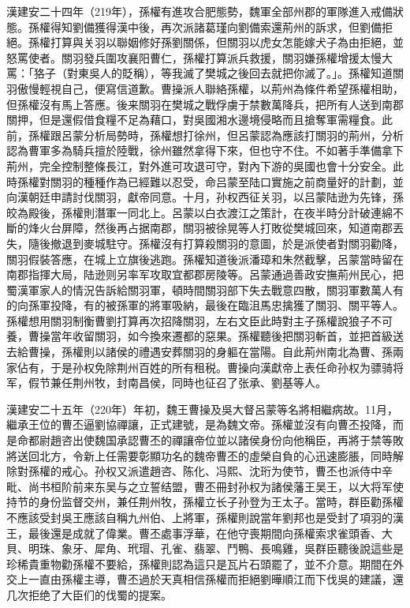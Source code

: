 漢建安二十四年（219年），孫權有進攻合肥態勢，魏軍全部州郡的軍隊進入戒備狀態。孫權得知劉備獲得漢中後，再次派諸葛瑾向劉備索還荊州的訴求，但劉備拒絕。孫權打算與关羽以聯姻修好孫劉關係，但關羽以虎女怎能嫁犬子為由拒絕，並怒罵使者。關羽發兵圍攻襄阳曹仁，孫權打算派兵救援，關羽嫌孫權增援太慢大罵：「狢子（對東吳人的貶稱），等我滅了樊城之後回去就把你滅了。」。孫權知道關羽傲慢輕視自己，便寫信道歉。曹操派人聯絡孫權，以荊州為條件希望孫權相助，但孫權沒有馬上答應。後来關羽在樊城之戰俘虜于禁數萬降兵，把所有人送到南郡關押，但是還假借食糧不足為藉口，對吳國湘水邊境侵略而且搶奪軍需糧食。此前，孫權跟呂蒙分析局勢時，孫權想打徐州，但呂蒙認為應該打關羽的荊州，分析認為曹軍多為騎兵擅於陸戰，徐州雖然拿得下來，但也守不住。不如著手準備拿下荊州，完全控制整條長江，對外進可攻退可守，對內下游的吳國也會十分安全。此時孫權對關羽的種種作為已經難以忍受，命吕蒙至陆口實施之前商量好的計劃，並向漢朝廷申請討伐關羽，獻帝同意。十月，孙权西征关羽，以吕蒙陆逊为先锋，孫皎為殿後，孫權則潛軍一同北上。呂蒙以白衣渡江之策計，在夜半時分計破連綿不斷的烽火台屏障，然後再占据南郡，關羽被徐晃等人打敗從樊城回來，知道南郡丟失，隨後撤退到麥城駐守。孫權沒有打算殺關羽的意圖，於是派使者對關羽勸降，關羽假裝答應，在城上立旗後逃跑。孫權知道後派潘璋和朱然截擊，呂蒙當時留在南郡指揮大局，陆逊则另率军攻取宜都郡房陵等。呂蒙通過善政安撫荊州民心，把蜀漢軍家人的情況告訴給關羽軍，頓時間關羽部下失去戰意四散，關羽軍數萬人有的向孫軍投降，有的被孫軍的將軍吸納，最後在臨沮馬忠擒獲了關羽、關平等人。孫權想用關羽制衡曹劉打算再次招降關羽，左右文臣此時對主子孫權說狼子不可養，曹操當年收留關羽，如今換來遷都的惡果。孫權聽後把關羽斬首，並把首級送去給曹操，孫權則以諸侯的禮遇安葬關羽的身軀在當陽。自此荊州南北為曹、孫兩家佔有，于是孙权免除荆州百姓的所有租税。曹操向漢獻帝上表任命孙权为骠骑将军，假节兼任荆州牧，封南昌侯，同時也征召了张承、劉基等人。

漢建安二十五年（220年）年初，魏王曹操及吳大督呂蒙等名將相繼病故。11月，繼承王位的曹丕逼劉協禪讓，正式建號，是為魏文帝。孫權並沒有向曹丕投降，而是命都尉趙咨出使魏国承認曹丕的禪讓帝位並以諸侯身份向他稱臣，再將于禁等敗將送回北方，令新上任需要彰顯功名的魏帝曹丕的虛榮自負的心迅速膨脹，同時解除對孫權的戒心。孙权又派遣趙咨、陈化、冯熙、沈珩为使节，曹丕也派侍中辛毗、尚书桓阶前来东吴与之立誓结盟，曹丕冊封孙权为諸侯藩王吴王，以大将军使持节的身份监督交州，兼任荆州牧，孫權立长子孙登为王太子。當時，群臣勸孫權不應該受封吳王應該自稱九州伯、上將軍，孫權則說當年劉邦也是受封了項羽的漢王，最後還是成就了偉業。曹丕處事浮華，在他守喪期間向孫權索求雀頭香、大貝、明珠、象牙、犀角、玳瑁、孔雀、翡翠、鬥鴨、長鳴雞，吳群臣聽後說這些是珍稀貴重物勸孫權不要給，孫權則認為這只是瓦片石頭罷了，並不介意。期間在外交上一直由孫權主導，曹丕過於天真相信孫權而拒絕劉曄順江而下伐吳的建議，還几次拒绝了大臣们的伐蜀的提案。

